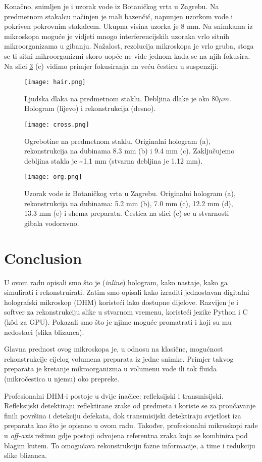 \documentclass[hidelinks]{ferseminareng}
\begin{document}
	Konačno, snimljen je i uzorak vode iz Botaničkog vrta u Zagrebu. Na predmetnom stakalcu načinjen je mali bazenčić, napunjen uzorkom vode i pokriven pokrovnim stakalcem. Ukupna visina uzorka je 8 mm. Na snimkama iz mikroskopa moguće je vidjeti mnogo interferencijskih uzoraka vrlo sitnih mikroorganizama u gibanju. Nažalost, rezolucija mikroskopa je vrlo gruba, stoga se ti sitni mikroorganizmi skoro uopće ne vide jednom kada se na njih fokusira. Na slici \ref{org} (c) vidimo primjer fokusiranja na veću česticu u suspenziji.
	
	\begin{figure}
		\centering
		\texttt{[image: hair.png]}
		\caption{Ljudska dlaka na predmetnom staklu. Debljina dlake je oko $80 \mu{m}$. Hologram (lijevo) i rekonstrukcija (desno).}
		\label{hair}
	\end{figure}
	
	\begin{figure}
		\centering
		\texttt{[image: cross.png]}
		\caption{Ogrebotine na predmetnom staklu. Originalni hologram (a), rekonstrukcija na dubinama 8.3 mm (b) i 9.4 mm (c). Zaključujemo debljina stakla je \textasciitilde1.1 mm (stvarna debljina je 1.12 mm).}
		\label{cross}
	\end{figure}
	
	\begin{figure}
		\centering
		\texttt{[image: org.png]}
		\caption{Uzorak vode iz Botaničkog vrta u Zagrebu. Originalni hologram (a), rekonstrukcija na dubinama: 5.2 mm (b), 7.0 mm (c), 12.2 mm (d), 13.3 mm (e) i shema preparata. Čestica na slici (c) se u stvarnosti gibala vodoravno.}
		\label{org}
	\end{figure}
	
	\section{Conclusion}
	U ovom radu opisali smo što je (\emph{inline}) hologram, kako nastaje, kako ga simulirati i rekonstruirati. Zatim smo opisali kako izraditi jednostavan digitalni holografski mikroskop (DHM) koristeći lako dostupne dijelove. Razvijen je i softver za rekonstrukciju slike u stvarnom vremenu, koristeći jezike Python i C (k\^{o}d za GPU). Pokazali smo što je njime moguće promatrati i koji su mu nedostaci (slika blizanca).
	
	Glavna prednost ovog mikroskopa je, u odnosu na klasične, mogućnost rekonstrukcije cijelog volumena preparata iz jedne snimke. Primjer takvog preparata je kretanje mikroorganizma u volumenu vode ili tok fluida (mikročestica u njemu) oko prepreke.
	
	Profesionalni DHM-i postoje u dvije inačice: refleksijski i transmisijski. Refleksijski detektiraju reflektirane zrake od predmeta i koriste se za proučavanje finih površina i detekciju defekata, dok transmisijski detektiraju svjetlost iza preparata kao što je opisano u ovom radu. Također, profesionalni mikroskopi rade u \emph{off-axis} režimu gdje postoji odvojena referentna zraka koja se kombinira pod blagim kutem. To omogućava rekonstrukciju fazne informacije, a time i redukciju slike blizanca.
	\vfill\null
	
	\nocite{*}
	
	
\end{document}

